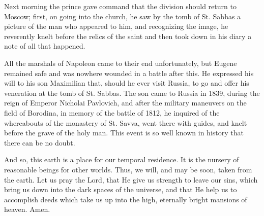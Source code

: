 Next morning the prince gave command that the division should return to Moscow; first, on going into the church, he saw by the tomb of St. Sabbas a picture of the man who appeared to him, and recognizing the image, he reverently knelt before the relics of the saint and then took down in his diary a note of all that happened.

All the marshals of Napoleon came to their end unfortunately, but Eugene remained safe and was nowhere wounded in a battle after this. He expressed his will to his son Maximilian that, should he ever visit Russia, to go and offer his veneration at the tomb of St. Sabbas. The son came to Russia in 1839, during the reign of Emperor Nicholai Pavlovich, and after the military maneuvers on the field of Borodina, in memory of the battle of 1812, he inquired of the whereabouts of the monastery of St. Savva, went there with guides, and knelt before the grave of the holy man. This event is so well known in history that there can be no doubt.

And so, this earth is a place for our temporal residence. It is the nursery of reasonable beings for other worlds. Thus, we will, and may be soon, taken from the earth. Let us pray the Lord, that He give us strength to leave our sins, which bring us down into the dark spaces of the universe, and that He help us to accomplish deeds which take us up into the high, eternally bright mansions of heaven. Amen.
